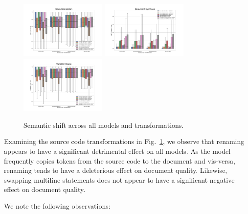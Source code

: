 \documentclass[usenames,dvipsnames]{article} %
\begin{document}
  \vspace{-10pt}\begin{figure}[H]
                  \centering\hspace*{-0.6cm}
                  \includegraphics[width=0.38\textwidth]{figs/Code Completion}\hspace*{-0.6cm}
                  \includegraphics[width=0.38\textwidth]{figs/Document Synthesis}\hspace*{-0.6cm}
                  \includegraphics[width=0.38\textwidth]{figs/Variable Misuse}
                  \caption{Semantic shift across all models and transformations.}
                  \label{fig:dataflow}
  \end{figure}

  Examining the source code transformations in Fig.~\ref{fig:dataflow}, we observe that renaming appears to have a significant detrimental effect on all models. As the model frequently copies tokens from the source code to the document and vis-versa, renaming tends to have a deleterious effect on document quality. Likewise, swapping multiline statements does not appear to have a significant negative effect on document quality.

  We note the following observations:
\end{document}
